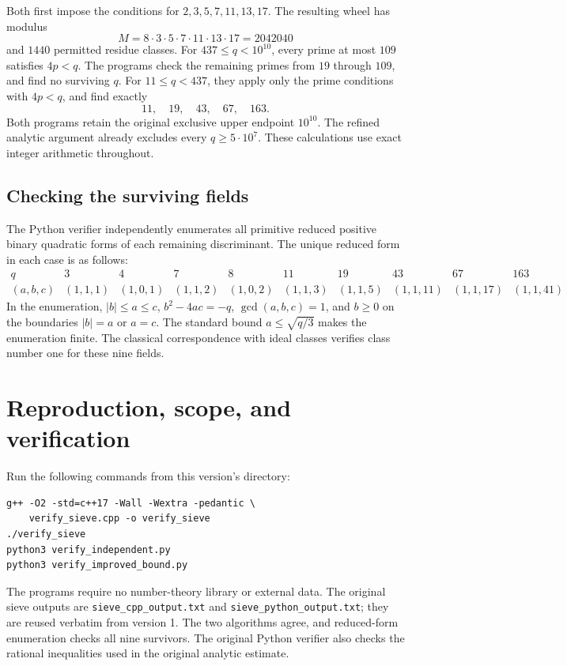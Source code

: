 \documentclass[11pt]{article}
\newcommand{\norm}[1]{\lvert #1\rvert}
\begin{document}
Both first impose the conditions for \(2,3,5,7,11,13,17\).
The resulting wheel has modulus
\[
 M=8\cdot3\cdot5\cdot7\cdot11\cdot13\cdot17
   =2042040
\]
and \(1440\) permitted residue classes.
For \(437\le q<10^{10}\), every prime at most \(109\) satisfies
\(4p<q\). The programs check the remaining primes from \(19\)
through \(109\), and find no surviving \(q\).
For \(11\le q<437\), they apply only the prime conditions
with \(4p<q\), and find exactly
\[
 11,\quad19,\quad43,\quad67,\quad163.
\]
Both programs retain the original exclusive upper endpoint
\(10^{10}\). The refined analytic argument already excludes every
\(q\ge5\cdot10^7\).
These calculations use exact integer arithmetic throughout.

\subsection*{Checking the surviving fields}
The Python verifier independently enumerates all primitive reduced
positive binary quadratic forms of each remaining discriminant.
The unique reduced form in each case is as follows:
\[
\begin{array}{c|rrrrrrrrr}
q&3&4&7&8&11&19&43&67&163\\ \hline
(a,b,c)&
(1,1,1)&(1,0,1)&(1,1,2)&(1,0,2)&
(1,1,3)&(1,1,5)&(1,1,11)&(1,1,17)&(1,1,41)
\end{array}
\]
In the enumeration, \(\norm b\le a\le c\),
\(b^2-4ac=-q\), \(\gcd(a,b,c)=1\), and \(b\ge0\) on
the boundaries \(\norm b=a\) or \(a=c\).
The standard bound \(a\le\sqrt{q/3}\) makes the enumeration finite.
The classical correspondence with ideal classes verifies
class number one for these nine fields.

\section{Reproduction, scope, and verification}\label{sec-audit}

Run the following commands from this version's directory:
\begin{verbatim}
g++ -O2 -std=c++17 -Wall -Wextra -pedantic \
    verify_sieve.cpp -o verify_sieve
./verify_sieve
python3 verify_independent.py
python3 verify_improved_bound.py
\end{verbatim}
The programs require no number-theory library or external data.
The original sieve outputs are \texttt{sieve\_cpp\_output.txt} and
\texttt{sieve\_python\_output.txt}; they are reused verbatim from version 1.
The two algorithms agree, and reduced-form enumeration checks all nine
survivors. The original Python verifier also checks the rational
inequalities used in the original analytic estimate.
\end{document}
